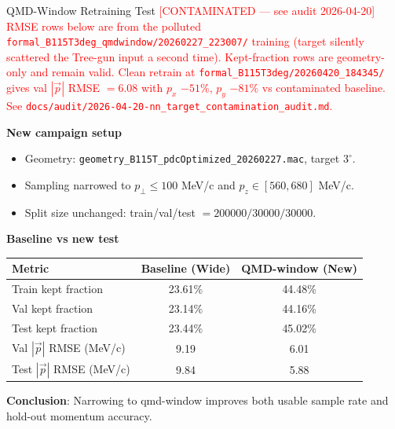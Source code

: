 \documentclass[aspectratio=169]{beamer}
\begin{document}
\begin{frame}{QMD-Window Retraining Test \textcolor{red}{[CONTAMINATED --- see audit 2026-04-20]}}
\textcolor{red}{\footnotesize RMSE rows below are from the polluted
\texttt{formal\_B115T3deg\_qmdwindow/20260227\_223007/} training (target
silently scattered the Tree-gun input a second time). Kept-fraction rows are
geometry-only and remain valid. Clean retrain at
\texttt{formal\_B115T3deg/20260420\_184345/} gives val $|\vec p|$ RMSE $=6.08$
with $p_x$ $-51\%$, $p_y$ $-81\%$ vs contaminated baseline. See
\texttt{docs/audit/2026-04-20-nn\_target\_contamination\_audit.md}.}

\textbf{New campaign setup}
\begin{itemize}
\item Geometry: \texttt{geometry\_B115T\_pdcOptimized\_20260227.mac}, target \(3^\circ\).
\item Sampling narrowed to \(p_\perp \le 100\) MeV/c and \(p_z \in [560,680]\) MeV/c.
\item Split size unchanged: train/val/test \(=200000/30000/30000\).
\end{itemize}

\textbf{Baseline vs new test}
\begin{center}
\small
\begin{tabular}{lcc}
\toprule
Metric & Baseline (Wide) & QMD-window (New) \\
\midrule
Train kept fraction & 23.61\% & 44.48\% \\
Val kept fraction & 23.14\% & 44.16\% \\
Test kept fraction & 23.44\% & 45.02\% \\
Val \(|\vec p|\) RMSE (MeV/c) & 9.19 & 6.01 \\
Test \(|\vec p|\) RMSE (MeV/c) & 9.84 & 5.88 \\
\bottomrule
\end{tabular}
\end{center}

\textbf{Conclusion}: Narrowing to qmd-window improves both usable sample rate and hold-out momentum accuracy.
\end{frame}
\end{document}
